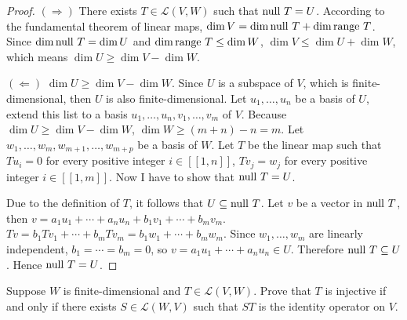 \begin{proof}
    $(\Rightarrow)$ There exists $T\in \mathcal{L}(V, W)$ such that $\operatorname{null}\,{T} = U$. According to the fundamental theorem of linear maps, $\dim V = \dim\operatorname{null}\,{T} + \dim\operatorname{range}\,{T}$. Since $\dim\operatorname{null}\,{T} = \dim U$ and $\dim\operatorname{range}\,{T}\leq \dim W$, $\dim V\leq \dim U + \dim W$, which means $\dim U\geq \dim V - \dim W$.

    $(\Leftarrow)$ $\dim U\geq \dim V - \dim W$. Since $U$ is a subspace of $V$, which is finite-dimensional, then $U$ is also finite-dimensional. Let $u_{1}, \ldots, u_{n}$ be a basis of $U$, extend this list to a basis $u_{1}, \ldots, u_{n}, v_{1}, \ldots, v_{m}$ of $V$. Because $\dim U\geq \dim V - \dim W$, $\dim W\geq (m + n) - n = m$. Let $w_{1}, \ldots, w_{m}, w_{m+1}, \ldots, w_{m+p}$ be a basis of $W$. Let $T$ be the linear map such that $Tu_{i} = 0$ for every positive integer $i\in[\![ 1,n ]\!]$, $Tv_{j} = w_{j}$ for every positive integer $i\in[\![ 1,m ]\!]$. Now I have to show that $\operatorname{null}\,{T} = U$.

    Due to the definition of $T$, it follows that $U\subseteq \operatorname{null}\,{T}$. Let $v$ be a vector in $\operatorname{null}\,{T}$, then $v = a_{1}u_{1} + \cdots + a_{n}u_{n} + b_{1}v_{1} + \cdots + b_{m}v_{m}$. $Tv = b_{1}Tv_{1} + \cdots + b_{m}Tv_{m} = b_{1}w_{1} + \cdots + b_{m}w_{m}$. Since $w_{1}, \ldots, w_{m}$ are linearly independent, $b_{1} = \cdots = b_{m} = 0$, so $v = a_{1}u_{1} + \cdots + a_{n}u_{n}\in U$. Therefore $\operatorname{null}\,{T}\subseteq U$. Hence $\operatorname{null}\,{T} = U$.
\end{proof}
\newpage

\begin{exercise}
    Suppose $W$ is finite-dimensional and $T\in\mathcal{L}(V, W)$. Prove that $T$ is injective if and only if there exists $S\in\mathcal{L}(W, V)$ such that $ST$ is the identity operator on $V$.
\end{exercise}

